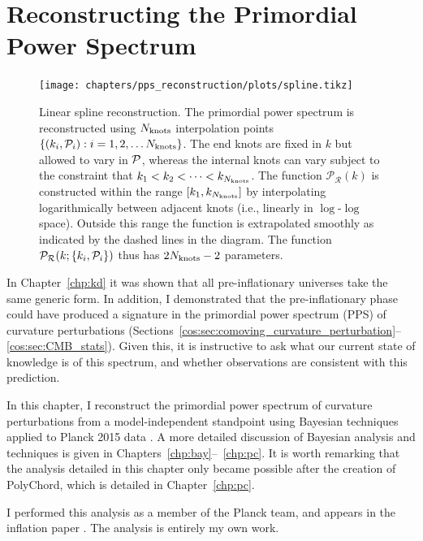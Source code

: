 \chapter[PPS reconstruction]{Reconstructing the Primordial Power Spectrum}
\label{chp:rec}

\begin{figure}[tp]
    \texttt{[image: chapters/pps\_reconstruction/plots/spline.tikz]}
  \caption{%
    Linear spline reconstruction. The primordial power spectrum is reconstructed using \(N_\mathrm{knots}\) interpolation points \({\{(k_i,\mathcal{P}_{i}):i=1,2,\ldots {N_\mathrm{knots}}\}}\). The end knots are fixed in \(k\) but allowed to vary in \({\mathcal{P}}\), whereas the internal knots can vary subject to the constraint that \({k_1<k_2<\cdots<k_{N_\mathrm{knots}}}\).  The function \(\mathcal{P}_\mathcal{R}(k)\) is constructed within the range \([k_1,k_{N_\mathrm{knots}}]\) by interpolating logarithmically between adjacent knots (i.e., linearly in \(\log\)-\(\log\) space). Outside this range the function is extrapolated smoothly as indicated by the dashed lines in the diagram.  The function \(\mathcal{P}_\mathcal{R}(k;\{k_i,\mathcal{P}_{i}\})\) thus has \(2N_\mathrm{knots}-2\) parameters.  }\label{fig:linear_spline_reconstruction}
\end{figure}

In Chapter~\ref{chp:kd} it was shown that all pre-inflationary universes take the same generic form. In addition, I demonstrated that the pre-inflationary phase could have produced a signature in the primordial power spectrum (PPS) of curvature perturbations (Sections~\ref{cos:sec:comoving_curvature_perturbation}--\ref{cos:sec:CMB_stats}). Given this, it is instructive to ask what our current state of knowledge is of this spectrum, and whether observations are consistent with this prediction.

In this chapter, I reconstruct the primordial power spectrum of curvature perturbations from a model-independent standpoint using Bayesian techniques applied to Planck 2015 data \citep{planck2015-a1}. A more detailed discussion of Bayesian analysis and techniques is given in Chapters~\ref{chp:bay}--~\ref{chp:pc}. It is worth remarking that the analysis detailed in this chapter only became possible after the creation of PolyChord, which is detailed in Chapter~\ref{chp:pc}. 

I performed this analysis as a member of the Planck team, and appears in the inflation paper \citep{planck2015-a24}. The analysis is entirely my own work.

